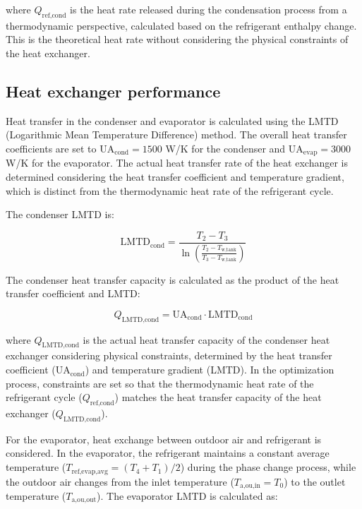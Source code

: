 \documentclass[letterpaper,10pt]{article}
\begin{document}
where $Q_{\text{ref,cond}}$ is the heat rate released during the condensation process from a thermodynamic perspective, calculated based on the refrigerant enthalpy change. This is the theoretical heat rate without considering the physical constraints of the heat exchanger.

\subsection{Heat exchanger performance}

Heat transfer in the condenser and evaporator is calculated using the LMTD (Logarithmic Mean Temperature Difference) method. The overall heat transfer coefficients are set to $\text{UA}_{\text{cond}} = 1500$ W/K for the condenser and $\text{UA}_{\text{evap}} = 3000$ W/K for the evaporator. The actual heat transfer rate of the heat exchanger is determined considering the heat transfer coefficient and temperature gradient, which is distinct from the thermodynamic heat rate of the refrigerant cycle.

The condenser LMTD is:

\begin{equation}
\label{eq:hpb_lmtd_cond}
\text{LMTD}_{\text{cond}} = \frac{T_2 - T_3}{\ln\left(\frac{T_2 - T_{\text{w,tank}}}{T_3 - T_{\text{w,tank}}}\right)}
\end{equation}

The condenser heat transfer capacity is calculated as the product of the heat transfer coefficient and LMTD:

\begin{equation}
\label{eq:hpb_q_lmtd_cond}
Q_{\text{LMTD,cond}} = \text{UA}_{\text{cond}} \cdot \text{LMTD}_{\text{cond}}
\end{equation}

where $Q_{\text{LMTD,cond}}$ is the actual heat transfer capacity of the condenser heat exchanger considering physical constraints, determined by the heat transfer coefficient ($\text{UA}_{\text{cond}}$) and temperature gradient (LMTD). In the optimization process, constraints are set so that the thermodynamic heat rate of the refrigerant cycle ($Q_{\text{ref,cond}}$) matches the heat transfer capacity of the heat exchanger ($Q_{\text{LMTD,cond}}$).

For the evaporator, heat exchange between outdoor air and refrigerant is considered. In the evaporator, the refrigerant maintains a constant average temperature ($T_{\text{ref,evap,avg}} = (T_4 + T_1)/2$) during the phase change process, while the outdoor air changes from the inlet temperature ($T_{\text{a,ou,in}} = T_0$) to the outlet temperature ($T_{\text{a,ou,out}}$). The evaporator LMTD is calculated as:
\end{document}
